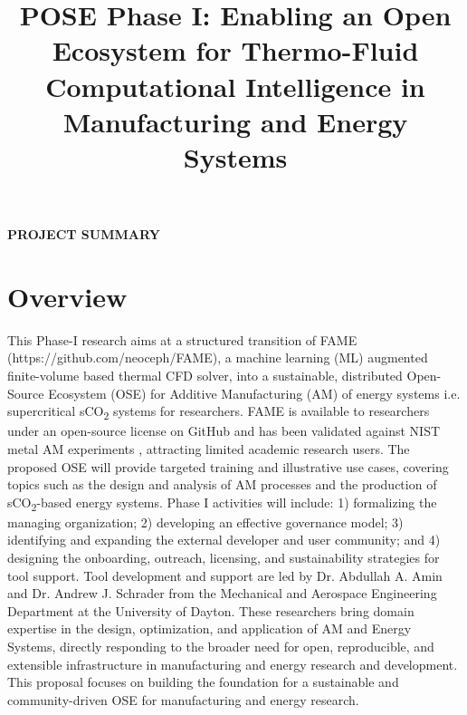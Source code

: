 \documentclass[11pt]{article}
\title{
    \vspace{-45pt}
    \fontsize{15pt}{18pt}\selectfont
    \textcolor{FlyersRed}
    {\textbf{POSE Phase I}: Enabling an Open Ecosystem for Thermo-Fluid Computational Intelligence in Manufacturing and Energy Systems}
}
\date{}
\author{}
\newcommand{\CO}[1]{CO\textsubscript{#1}}
\begin{document}
\pagestyle{empty} %
\vspace{-4\baselineskip}
\begin{center}
    \Large\textbf{\textcolor{FlyersRed}{PROJECT SUMMARY}}
\end{center}
\vspace{-1.4\baselineskip}


\section*{Overview}
\vspace{-3pt}
\noindent
This Phase-I research aims at a structured transition of FAME (https://github.com/neoceph/FAME), a machine learning (ML) augmented finite-volume based thermal CFD solver, into a sustainable, distributed Open-Source Ecosystem (OSE) for Additive Manufacturing (AM) of energy systems i.e. supercritical s\CO{2} systems for  researchers. FAME is available to researchers under an open-source license on GitHub and has been validated against NIST metal AM experiments \cite{aminPhysicsGuidedHeat2024}, attracting limited academic research users. The proposed OSE will provide targeted training and illustrative use cases, covering topics such as the design and analysis of AM processes and the production of s\CO{2}-based energy systems. Phase I activities will include: 1) formalizing the managing organization; 2) developing an effective governance model; 3) identifying and expanding the external developer and user community; and 4) designing the onboarding, outreach, licensing, and sustainability strategies for tool support. Tool development and support are led by Dr. Abdullah A. Amin and Dr. Andrew J. Schrader from the Mechanical and Aerospace Engineering Department at the University of Dayton. These researchers bring domain expertise in the design, optimization, and application of AM and Energy Systems, directly responding to the broader need for open, reproducible, and extensible infrastructure in manufacturing and energy research and development. This proposal focuses on building the foundation for a sustainable and community-driven OSE for manufacturing and energy research.
%
\vspace{-3pt}
\end{document}
